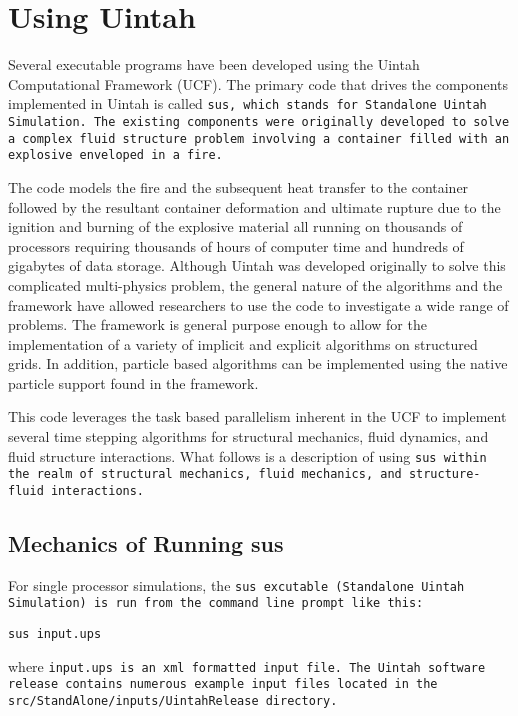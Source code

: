 \section{Using Uintah} \label{Sec:UCF}

Several executable programs have been developed using the Uintah
Computational Framework (UCF).  The primary code that drives the
components implemented in Uintah is called \tt sus, \normalfont which
stands for Standalone Uintah Simulation.  The existing components were
originally developed to solve a complex fluid structure problem
involving a container filled with an explosive enveloped in a fire.

The code models the fire and the subsequent heat transfer to the
container followed by the resultant container deformation and ultimate
rupture due to the ignition and burning of the explosive material all
running on thousands of processors requiring thousands of hours of
computer time and hundreds of gigabytes of data storage.  Although
Uintah was developed originally to solve this complicated
multi-physics problem, the general nature of the algorithms and the
framework have allowed researchers to use the code to investigate a
wide range of problems.  The framework is general purpose enough to
allow for the implementation of a variety of implicit and explicit
algorithms on structured grids.  In addition, particle based
algorithms can be implemented using the native particle support found
in the framework.

This code leverages the task based parallelism inherent in the UCF to
implement several time stepping algorithms for structural mechanics,
fluid dynamics, and fluid structure interactions.  What follows is a
description of using \tt sus \normalfont within the realm of
structural mechanics, fluid mechanics, and structure-fluid
interactions.


\subsection{Mechanics of Running sus}

For single processor simulations, the \tt sus \normalfont excutable
(Standalone Uintah Simulation) is run from the command line prompt
like this:
\begin{Verbatim}[fontsize=\footnotesize]
  sus input.ups
\end{Verbatim}
where \tt input.ups \normalfont is an xml formatted input file.  The
Uintah software release contains numerous example input files located
in the \tt src/StandAlone/inputs/UintahRelease \normalfont directory.

